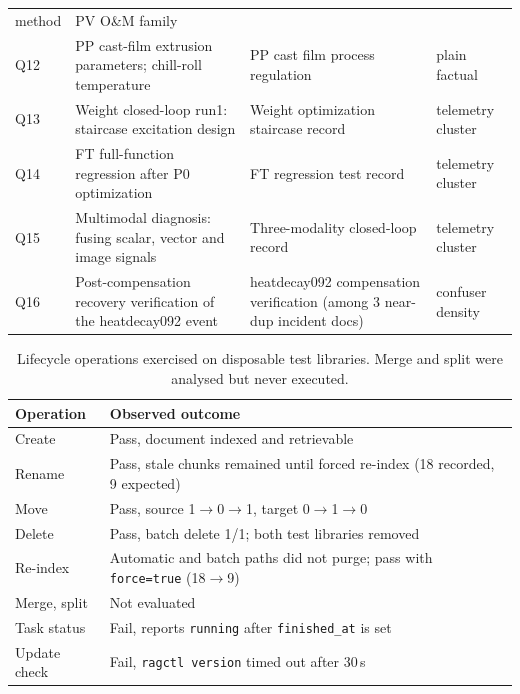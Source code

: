 \begin{table}[t]
\begin{tabular}{@{}l>{\raggedright\arraybackslash}p{7.3cm}>{\raggedright\arraybackslash}p{4.4cm}>{\raggedright\arraybackslash}p{3.5cm}@{}}
method & PV O\&M family \\
Q12 & PP cast-film extrusion parameters; chill-roll temperature & PP cast
film process regulation & plain factual \\
Q13 & Weight closed-loop run1: staircase excitation design & Weight
optimization staircase record & telemetry cluster \\
Q14 & FT full-function regression after P0 optimization & FT regression test
record & telemetry cluster \\
Q15 & Multimodal diagnosis: fusing scalar, vector and image signals &
Three-modality closed-loop record & telemetry cluster \\
Q16 & Post-compensation recovery verification of the heatdecay092 event &
heatdecay092 compensation verification (among 3 near-dup incident docs) &
confuser density \\
\bottomrule
\end{tabular}
\end{table}

\begin{table}[t]
\centering
\small
\setlength{\tabcolsep}{4pt}
\caption{Lifecycle operations exercised on disposable test libraries.
Merge and split were analysed but never executed.}
\label{tab:org-ops}
\begin{tabular}{@{}l>{\raggedright\arraybackslash}p{11.2cm}@{}}
\toprule
Operation & Observed outcome \\
\midrule
Create & Pass, document indexed and retrievable \\
Rename & Pass, stale chunks remained until forced re-index (18 recorded, 9 expected) \\
Move & Pass, source 1$\rightarrow$0$\rightarrow$1, target 0$\rightarrow$1$\rightarrow$0 \\
Delete & Pass, batch delete 1/1; both test libraries removed \\
Re-index & Automatic and batch paths did not purge; pass with \texttt{force=true} (18$\rightarrow$9) \\
Merge, split & Not evaluated \\
Task status & Fail, reports \texttt{running} after \texttt{finished\_at} is set \\
Update check & Fail, \texttt{ragctl version} timed out after 30\,s \\
\bottomrule
\end{tabular}
\end{table}

